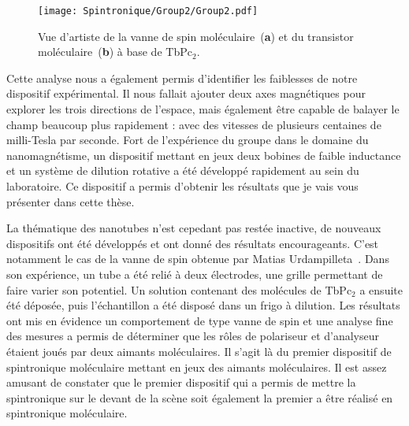\begin{figure}[H]
\centering \texttt{[image: Spintronique/Group2/Group2.pdf]}
\caption{Vue d'artiste de la vanne de spin moléculaire~(\textbf{a}) et du transistor moléculaire~(\textbf{b}) à base de TbPc$_{2}$.}
\label{Group2}
\end{figure}

Cette analyse nous a également permis d'identifier les faiblesses de notre dispositif expérimental. Il nous fallait ajouter deux axes magnétiques pour explorer les trois directions de l'espace, mais également être capable de balayer le champ beaucoup plus rapidement : avec des vitesses de plusieurs centaines de milli-Tesla par seconde. Fort de l'expérience du groupe dans le domaine du nanomagnétisme, un dispositif mettant en jeux deux bobines de faible inductance et un système de dilution rotative a été développé rapidement au sein du laboratoire. Ce dispositif a permis d'obtenir les résultats que je vais vous présenter dans cette thèse.

La thématique des nanotubes n'est cepedant pas restée inactive, de nouveaux dispositifs ont été développés et ont donné des résultats encourageants. C'est notamment le cas de la vanne de spin obtenue par Matias Urdampilleta~\cite{Urdampilleta2011}. Dans son expérience, un tube a été relié à deux électrodes, une grille permettant de faire varier son potentiel. Un solution contenant des molécules de TbPc$_{2}$ a ensuite été déposée, puis l'échantillon a été disposé dans un frigo à dilution. Les résultats ont mis en évidence un comportement de type vanne de spin et une analyse fine des mesures a permis de déterminer que les rôles de polariseur et d'analyseur étaient joués par deux aimants moléculaires. Il s'agit là du premier dispositif de spintronique moléculaire mettant en jeux des aimants moléculaires. Il est assez amusant de constater que le premier dispositif qui a permis de mettre la spintronique sur le devant de la scène soit également la premier a être réalisé en spintronique moléculaire.
